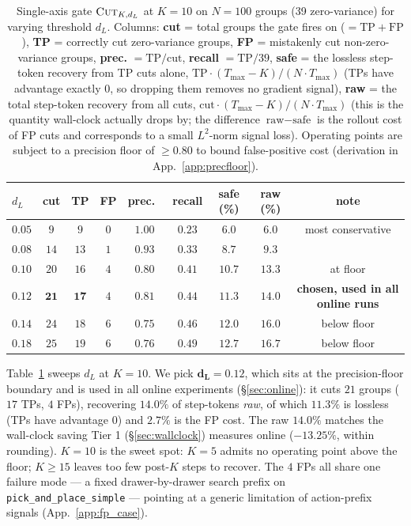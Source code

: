 \documentclass{article}
\begin{document}
\begin{table}[t]
\centering
\caption{Single-axis gate $\textsc{Cut}_{K, d_L}$ at $K\!=\!10$ on
$N\!=\!100$ groups (39 zero-variance) for varying threshold $d_L$.
Columns: \textbf{cut} = total groups the gate fires on
($=\!\text{TP}\!+\!\text{FP}$),
\textbf{TP} = correctly cut zero-variance groups,
\textbf{FP} = mistakenly cut non-zero-variance groups,
\textbf{prec.} $=\!\text{TP}/\text{cut}$,
\textbf{recall} $=\!\text{TP}/39$,
\textbf{safe} = the lossless step-token recovery from TP cuts
alone, $\text{TP}\!\cdot\!(T_{\max}\!-\!K)/(N\!\cdot\!T_{\max})$ (TPs
have advantage exactly $0$, so dropping them removes no gradient
signal),
\textbf{raw} = the total step-token recovery from all cuts,
$\text{cut}\!\cdot\!(T_{\max}\!-\!K)/(N\!\cdot\!T_{\max})$ (this is the
quantity wall-clock actually drops by; the difference
$\text{raw}-\text{safe}$ is the rollout cost of FP cuts and
corresponds to a small $L^2$-norm signal loss).
Operating points are subject to a precision floor of
$\ge\!0.80$ to bound false-positive cost (derivation in
App.~\ref{app:precfloor}).}
\label{tab:ablation}
\small
\begin{tabular}{lcccccccc}
\toprule
$d_L$ & cut & TP & FP & prec.\ & recall & safe (\%) & raw (\%) & note \\
\midrule
$0.05$ & $9$  & $9$  & $0$ & $1.00$ & $0.23$ & $6.0$  & $6.0$  & most conservative \\
$0.08$ & $14$ & $13$ & $1$ & $0.93$ & $0.33$ & $8.7$  & $9.3$  &  \\
$0.10$ & $20$ & $16$ & $4$ & $0.80$ & $0.41$ & $10.7$ & $13.3$ & at floor \\
\textbf{$0.12$} & $\mathbf{21}$ & $\mathbf{17}$ & $4$ & $\mathbf{0.81}$ & $0.44$ & $\mathbf{11.3}$ & $\mathbf{14.0}$ & \textbf{chosen, used in all online runs} \\
$0.14$ & $24$ & $18$ & $6$ & $0.75$ & $0.46$ & $12.0$ & $16.0$ & below floor \\
$0.18$ & $25$ & $19$ & $6$ & $0.76$ & $0.49$ & $12.7$ & $16.7$ & below floor \\
\bottomrule
\end{tabular}
\end{table}

Table~\ref{tab:ablation} sweeps $d_L$ at $K\!=\!10$. We pick
$\mathbf{d_L\!=\!0.12}$, which sits at the precision-floor
boundary and is used in all online experiments
(\S\ref{sec:online}): it cuts $21$ groups ($17$ TPs, $4$ FPs),
recovering $\mathbf{14.0\%}$ of step-tokens \emph{raw}, of which
$\mathbf{11.3\%}$ is lossless (TPs have advantage $0$) and
$2.7\%$ is the FP cost. The raw $14.0\%$ matches the wall-clock
saving Tier 1 (\S\ref{sec:wallclock}) measures online
($-13.25\%$, within rounding). $K\!=\!10$ is the sweet spot:
$K\!=\!5$ admits no operating point above the floor;
$K\!\ge\!15$ leaves too few post-$K$ steps to recover. The $4$
FPs all share one failure mode --- a fixed drawer-by-drawer
search prefix on \texttt{pick\_and\_place\_simple} --- pointing
at a generic limitation of action-prefix signals
(App.~\ref{app:fp_case}).
\end{document}
